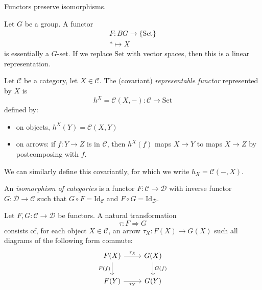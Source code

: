 \documentclass[12pt]{article}
\begin{document}
\begin{corollary}
	Functors preserve isomorphisms.
\end{corollary}

\begin{example}
	 Let $G$ be a group. A functor 
	\begin{gather*}
		F:BG \to \{\text{Set}\} \\
		\ast \mapsto X 
	\end{gather*}
	is essentially a $G$-set. If we replace $\text{Set}$ with vector spaces, then this is a linear representation.
\end{example}

\begin{definition}
	Let $\mathcal{C}$ be a category, let $X\in\mathcal{C}$. The (covariant) \emph{representable functor} represented by $X$ is 
	\begin{equation*}
		h^X = \mathcal{C}(X,-): \mathcal{C} \to \text{Set}
	\end{equation*}
	defined by: 
	\begin{itemize}
		\item on objects, $h^X(Y) = \mathcal{C}(X,Y)$
		\item on arrows: if $f:Y\to Z$ is in $\mathcal{C}$, then $h^X(f)$ maps $X\to Y$ to maps $X\to Z$ by postcomposing with $f$. 
	\end{itemize}
	We can similarly define this covariantly, for which we write $h_X=\mathcal{C}(-,X)$.
\end{definition}

\begin{definition}
	An \emph{isomorphism of categories} is a functor $F:\mathcal{C}\to\mathcal{D}$ with inverse functor $G:\mathcal{D}\to\mathcal{C}$ such that $G\circ F=\text{Id}_\mathcal{C}$ and $F\circ G=\text{Id}_\mathcal{D}$.
\end{definition}

\begin{definition}
	Let $F,G: \mathcal{C}\to\mathcal{D}$ be functors. A natural transformation
	\begin{equation*}
		\tau: F\Rightarrow G
	\end{equation*}
	consists of, for each object $X\in\mathcal{C}$, an arrow $\tau_X:F(X)\to G(X)$ such all diagrams of the following form commute:
	\begin{equation*}
\begin{tikzcd}
F(X) \arrow[r, "\tau_X"] \arrow[d, "F(f)"'] & G(X) \arrow[d, "G(f)"] \\
F(Y) \arrow[r, "\tau_Y"']                   & G(Y)                  
\end{tikzcd}
	\end{equation*}
\end{definition}
\end{document}
